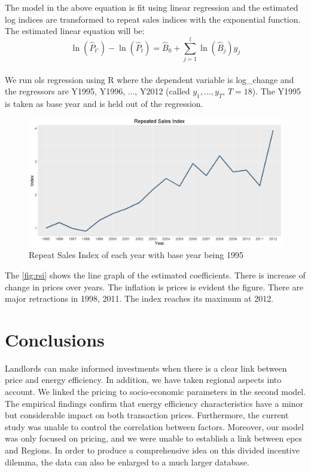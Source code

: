 \documentclass[12pt]{article}
\begin{document}
The model in the above equation is fit using linear regression and the estimated log indices are transformed to repeat sales indices with the exponential function. The estimated linear equation will be:
$$\ln (\hat P_{t'})-\ln(\hat P_t)=\hat B_{0}+\sum_{j=1} ^{l} \ln (\hat B_j) y_{j}$$
\\
We run \acrshort{ols} regression using R where the dependent variable is log\_change and the regressors are Y1995, Y1996, ..., Y2012 (called $y_1, ..., y_T$, $T=18$). The Y1995 is taken as base year and is held out of the regression.
 
\begin{figure}[H]
    \centering
    \includegraphics[width=18cm]{5. RSI images/rsiplot.png}
    \caption{Repeat Sales Index of each year with base year being 1995}
    \label{fig:rsi}
\end{figure}

The \autoref{fig:rsi} shows the line graph of the estimated coefficients. There is increase of change in prices over years. The inflation is prices is evident the figure. There are major retractions in 1998, 2011. The index reaches its maximum at 2012.

\section{Conclusions}
\label{sec:conc}
Landlords can make informed investments when there is a clear link between price and energy efficiency. In addition, we have taken regional aspects into account. We linked the pricing to socio-economic parameters in the second model. The empirical findings confirm that energy efficiency characteristics have a minor but considerable impact on both transaction prices. Furthermore, the current study was unable to control the correlation between factors. Moreover, our model was only focused on pricing, and we were unable to establish a link between \acrshort{epc}s and Regions. In order to produce a comprehensive idea on this divided incentive dilemma, the data can also be enlarged to a much larger database.
\end{document}
